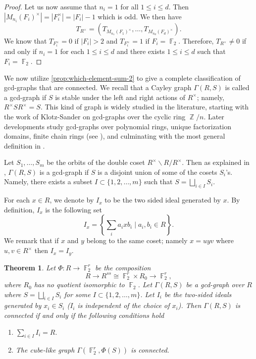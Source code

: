 \documentclass[11pt, a4paper]{amsart}
\newtheorem{thm}{Theorem}[section]
\theoremstyle{definition}
\DeclareMathOperator{\Z}{\mathbb{Z}}
\DeclareMathOperator{\F}{\mathbb{F}}
\numberwithin{equation}{section}
\begin{document}
\begin{proof}
Let us now assume that $n_i=1$ for all $1 \leq i \leq d.$ Then $|M_{n_i}(F_i)^{\times}|=|F_i^{\times}|=|F_i|-1$ which is odd. We then have 
\[ T_{R^{\times}} = (T_{M_{n_1}(F_1)^{\times}}, \ldots, T_{M_{n_d}(F_d)^{\times}}).\]
We know that $T_{F_i^{\times}}=0$ if $|F_i|>2$ and $T_{F_i^{\times}}=1$ if $F_i =\F_2.$ Therefore, $T_{R^{\times}} \neq 0$ if and only if $n_i=1$ for each $1 \leq i \leq d$ and there exists $1 \leq i \leq d$ such that $F_i=\F_2.$
\end{proof}
We now utilize \cref{prop:which-element-sum-2} to give a complete classification of gcd-graphs that are connected. We recall that a Cayley graph $\Gamma(R,S)$ is called a gcd-graph if $S$ is stable under the left and right actions of $R^{\times}$; namely, $R^{\times} S R^{\times}=S.$ This kind of graph is widely studied in the literature, starting with the work of Klotz-Sander on gcd-graphs over the cyclic ring $\Z/n$. Later developments study gcd-graphs over polynomial rings, unique factorization domains, finite chain rings (see \cite{kiani2011energy, minavc2024gcd, suntornpoch2016cayley}), and culminating with the most general definition in \cite{nguyengcd2026}.

Let \(S_1,\ldots,S_m\) be the orbits of the double coset \(R^\times\backslash R/R^\times\).  Then as explained in \cite{nguyen2025supercharacters}, $\Gamma(R,S)$ is a gcd-graph if $S$ is a disjoint union of some of the cosets $S_i$'s. Namely, there exists a subset $I \subset \{1, 2, \ldots, m\}$ such that $S= \bigsqcup_{i \in I} S_i.$


For each $x \in R$, we denote by $I_x$ to be the two sided ideal generated by $x.$ By definition, $I_x$ is the following set 
\[ I_x = \left\{ \sum_{i} a_i x b_i \mid a_i, b_i \in R \right\}.\]
We remark that if $x$ and $y$ belong to the same coset; namely $x=u yv$ where $u, v \in R^{\times}$ then  $I_x = I_y.$ 


\begin{thm}
Let \(\Phi:R\to \F_2^r\) be the composition
\[
R\to R^{ss}\cong \F_2^r\times R_0 \to \F_2^r,
\]
where \(R_0\) has no quotient isomorphic to \(\F_2\). Let $\Gamma(R,S)$ be a gcd-graph over $R$ where  $S = \bigsqcup_{i \in I} S_i$ for some $I \subset \{1, 2, \ldots, m \}$. Let $I_i$ be the two-sided ideals generated by $x_i \in S_i$ ($I_i$ is independent of the choice of $x_i$). Then $\Gamma(R,S)$ is connected if and only if the following conditions hold 
 \begin{enumerate}
     \item $\sum_{i \in I} I_i =R.$
     \item The cube-like graph $\Gamma(\F_2^r, \Phi(S))$ is connected. 
 \end{enumerate}
\end{thm}
\end{document}
